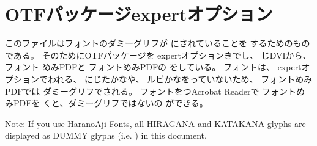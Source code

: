 \documentclass{jsarticle}
\begin{document}
\section{OTFパッケージexpertオプション}

このファイルはフォントのダミーグリフが
にされていることを
するためのものである。
そのためにOTFパッケージを
expertオプションきでし、
じDVIから、フォント
めみPDFと
フォントめみPDFの
をしている。
フォントは、
expertオプションでわれる、
にじたかなや、
ルビかなをっていないため、
フォントめみPDFでは
ダミーグリフでされる。
フォントをつAcrobat Readerで
フォントめみPDFを
くと、ダミーグリフではないの
ができる。

Note: If you use HaranoAji Fonts,
all HIRAGANA and KATAKANA glyphs are displayed as DUMMY glyphs (i.e. )
in this document.
\end{document}
